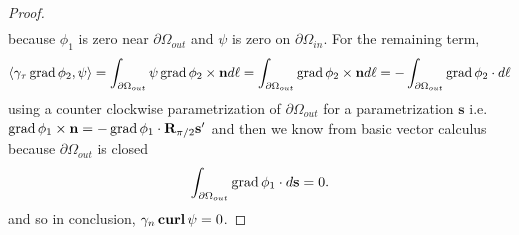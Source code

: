 \documentclass[../master_thesis.tex]{subfiles}
\begin{document}
\begin{proof}
\begin{align*}
    \end{align*}
    because $\phi_1$ is zero near $\partial \Omega_{out}$ and $\psi$ is zero on 
    $\partial \Omega_{in}$. For the remaining term, 
    \begin{align*}
        \langle \gamma_\tau \operatorname{grad} \phi_2, \psi \rangle
        = \int_{\partial\Omega_{out}} \psi \operatorname{grad} \phi_2 \times \mathbf{n}d\ell 
        = \int_{\partial\Omega_{out}} \operatorname{grad} \phi_2 \times \mathbf{n} d\ell 
        = - \int_{\partial\Omega_{out}} \operatorname{grad} \phi_2 \cdot d\ell
    \end{align*}
    using a counter clockwise parametrization of $\partial\Omega_{out}$ 
    for a parametrization $\mathbf{s}$
    i.e. $\operatorname{grad} \phi_1 \times \mathbf{n} = -\operatorname{grad} \phi_1 \cdot \mathbf{R}_{\pi/2}\mathbf{s}'$
    and then we know from basic vector calculus because $\partial\Omega_{out}$ is closed
    \begin{align*}
        \int_{\partial\Omega_{out}} \operatorname{grad} \phi_1 \cdot d\mathbf{s} = 0.
    \end{align*}
    and so in conclusion, $\gamma_n \veccurl \psi = 0$.
\end{proof}
\end{document}
